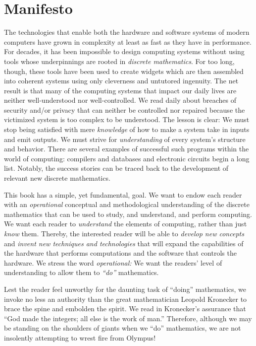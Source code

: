 
\chapter*{Manifesto}

The technologies that enable both the hardware and software systems of modern computers have grown in complexity at least as fast as they have in performance.  For decades, it has been impossible to design computing systems without using tools whose underpinnings are rooted
in {\it discrete mathematics}.  For too long, though, these tools have been used to create widgets which are then assembled into coherent systems using only cleverness and untutored ingenuity.  The net result is that many of the computing systems that impact our daily lives are neither well-understood nor well-controlled.  We read daily about breaches of security and/or privacy that can neither be controlled nor repaired because the victimized system is too complex to be understood.  The lesson is clear: We must stop being satisfied with mere {\em knowledge} of how to make a system take in inputs and emit outputs.  We must strive for {\em understanding} of every system's
structure and behavior.  There are several examples of successful such programs within the world of computing: compilers and databases and electronic circuits begin a long list.  Notably, the success stories can be traced back to the development of relevant new discrete mathematics.

This book has a simple, yet fundamental, goal.  We want to endow each reader with an {\em operational} conceptual and methodological understanding of the discrete mathematics that can be used to study, and understand, and perform computing.  We want each reader to {\em understand} the elements of computing, rather than just {\em know} them.  Thereby, the interested reader will be able to {\em develop new concepts} and {\em invent new techniques and technologies} that will expand the capabilities of the hardware that performs computations and the software that controls the hardware.  We stress the word {\it operational:}  We want the readers' level of understanding to allow them to {\em ``do''} mathematics.

\bigskip

Lest the reader feel unworthy for the daunting task of ``doing'' mathematics, we invoke no less an authority than the great mathematician Leopold Kronecker to brace
the spine and embolden the spirit.  We read in \cite{Bell86} Kronecker's assurance that ``God made the integers; all else is the work of man.''  Therefore, although we may be standing on the
shoulders of giants when we ``do'' mathematics, we are not insolently attempting to wrest fire from Olympus!

